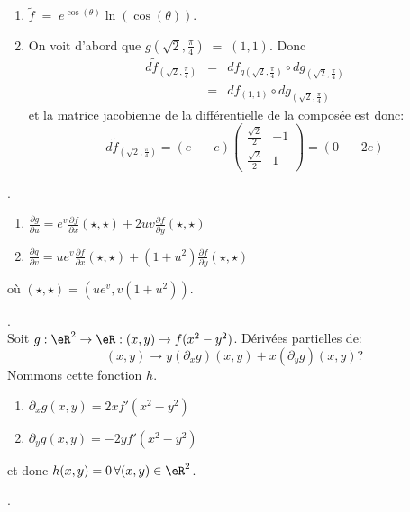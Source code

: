 \begin{enumerate}
	\item $\tilde{f} \;=\;e^{\cos(\theta)}\ln(\cos(\theta))$.
	\item On voit d'abord que $g(\sqrt2, \frac{\pi}{4})\;=\;(1,1)$. Donc
	      \[\begin{array}{cccc} d\tilde{f}_{(\sqrt2, \frac{\pi}{4})} & = & df_{g(\sqrt2, \frac{\pi}{4})}\circ dg_{(\sqrt2, \frac{\pi}{4})} \\
                                                         & = & df_{(1,1)}\circ dg_{(\sqrt2, \frac{\pi}{4})}\end{array}\]
	      et  la matrice jacobienne de la différentielle de la composée est donc:\[d\tilde{f}_{(\sqrt2, \frac{\pi}{4})}=(e\;\;-e)\left(\begin{array}{cc} \frac{\sqrt2}{2} & -1 \\
             \frac{\sqrt2}{2}      & 1\end{array}\right)=(0\;\;-2e)\]



\end{enumerate}


.
\begin{enumerate}
	\item $\frac{ \partial g }{ \partial u } = e^v\frac{ \partial f }{ \partial x }(\star,\star)+2uv\frac{ \partial f }{ \partial y }(\star,\star)$
	\item $\frac{ \partial g }{ \partial v } = ue^v\frac{ \partial f }{ \partial x }(\star,\star)+(1+u^2)\frac{ \partial f }{ \partial y }(\star,\star)$
\end{enumerate}
où $(\star,\star) = (ue^v,v(1+u^2))$.

\vspace{1cm}

. \\

\noindent Soit $g:\eR^2\rightarrow \eR:(x,y)\rightarrow  f(x^2-y^2)$. Dérivées partielles de:\[(x,y)\rightarrow  y(\partial_xg)(x,y)+x(\partial_yg)(x,y)?\]
Nommons cette fonction $h$.
\begin{enumerate}
	\item $\partial_xg(x,y) = 2xf'(x^2-y^2)$
	\item$\partial_yg(x,y) = -2yf'(x^2-y^2)$
\end{enumerate}
et donc $h(x,y) = 0 \, \forall (x,y)\in \eR^2$.

\vspace{1cm}


. \\


